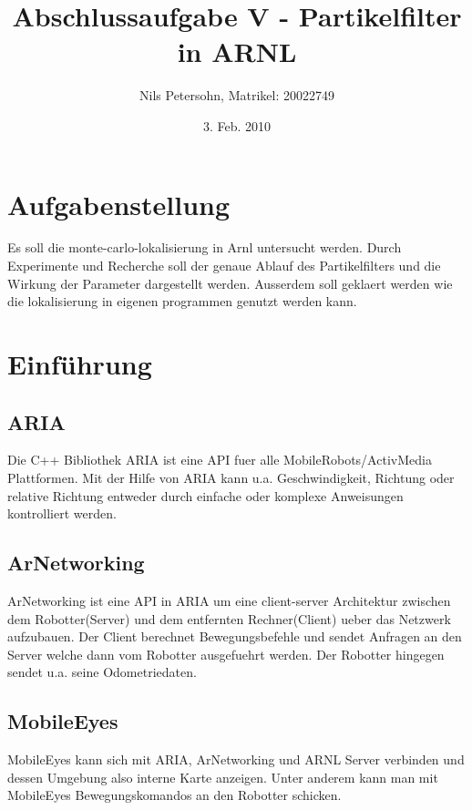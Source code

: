 \documentclass{article}
\title{Abschlussaufgabe V - Partikelfilter in ARNL}
\author{Nils Petersohn, Matrikel: 20022749}
\date{3. Feb. 2010}
\begin{document}
\maketitle



\section{Aufgabenstellung}
Es soll die monte-carlo-lokalisierung in Arnl untersucht werden. Durch Experimente und Recherche soll der genaue Ablauf des Partikelfilters und die Wirkung der Parameter dargestellt werden. Ausserdem soll geklaert werden wie die lokalisierung in eigenen programmen genutzt werden kann.


\section{Einf\"uhrung}\label{einfuehrung}



\subsection{ARIA}
Die C++ Bibliothek ARIA ist eine API fuer alle MobileRobots/ActivMedia Plattformen. Mit der Hilfe von ARIA kann u.a. Geschwindigkeit, Richtung oder relative Richtung entweder durch einfache oder komplexe Anweisungen kontrolliert werden.



\subsection{ArNetworking}

ArNetworking ist eine API in ARIA um eine client-server Architektur zwischen dem Robotter(Server) und dem entfernten Rechner(Client) ueber das Netzwerk aufzubauen. Der Client berechnet Bewegungsbefehle und sendet Anfragen an den Server welche dann vom Robotter ausgefuehrt werden. Der Robotter hingegen sendet u.a. seine Odometriedaten. 


\subsection{MobileEyes}
MobileEyes kann sich mit ARIA, ArNetworking und ARNL Server verbinden und dessen Umgebung also interne Karte anzeigen.
Unter anderem kann man mit MobileEyes Bewegungskomandos an den Robotter schicken.\cite{whitbrook1}
\end{document}
